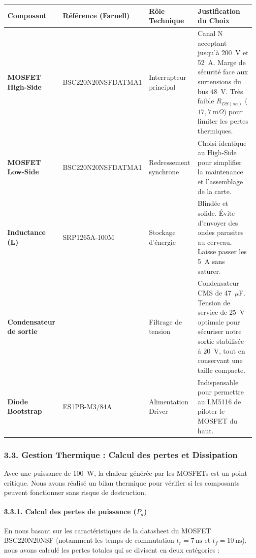 \begin{tableau}[H]
    \centering
    \scriptsize
    \begin{tabular}{|p{3cm}|>{\raggedright\arraybackslash}p{3cm}|p{3cm}|>{\raggedright\arraybackslash}p{5cm}|}
    \hline
    \textbf{Composant} & \textbf{Référence (Farnell)} & \textbf{Rôle Technique} & \textbf{Justification du Choix} \\
    \hline
    \textbf{MOSFET High-Side} & BSC220N20NSFDATMA1 & Interrupteur principal & Canal N acceptant jusqu'à 200~V et 52~A. Marge de sécurité face aux surtensions du bus 48~V. Très faible $R_{DS(on)}$ ($17,7~\text{m}\Omega$) pour limiter les pertes thermiques. \\
    \hline
    \textbf{MOSFET Low-Side} & BSC220N20NSFDATMA1 & Redressement synchrone & Choisi identique au High-Side pour simplifier la maintenance et l’assemblage de la carte. \\
    \hline
    \textbf{Inductance (L)} & SRP1265A-100M & Stockage d'énergie & Blindée et solide. Évite d'envoyer des ondes parasites au cerveau. Laisse passer les 5~A sans saturer. \\
    \hline
    \textbf{Condensateur de sortie} & 875075555002 & Filtrage de tension & Condensateur CMS de 47~$\mu$F. Tension de service de 25~V optimale pour sécuriser notre sortie stabilisée à 20~V, tout en conservant une taille compacte. \\
    \hline
    \textbf{Diode Bootstrap} & ES1PB-M3/84A & Alimentation Driver & Indispensable pour permettre au LM5116 de piloter le MOSFET du haut. \\
    \hline
    \end{tabular}
    \caption{Choix des composants de puissance (USB-C).}
\end{tableau}

\subsubsection*{3.3. Gestion Thermique : Calcul des pertes et Dissipation}
Avec une puissance de 100~W, la chaleur générée par les MOSFETs est un point critique. Nous avons réalisé un bilan thermique pour vérifier si les composants peuvent fonctionner sans risque de destruction.

\paragraph{3.3.1. Calcul des pertes de puissance ($P_d$)}
En nous basant sur les caractéristiques de la datasheet du MOSFET BSC220N20NSF (notamment les temps de commutation $t_r = 7~\text{ns}$ et $t_f = 10~\text{ns}$), nous avons calculé les pertes totales qui se divisent en deux catégories :

